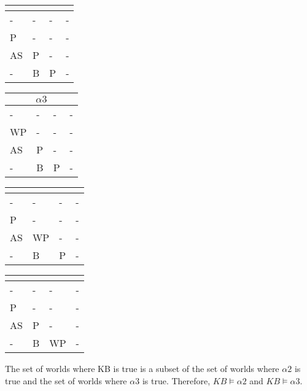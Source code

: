 \documentclass{math}
\begin{document}
\begin{center}
  \begin{tabular}{|p{0.6cm}|p{0.6cm}|p{0.6cm}|p{0.6cm}|}
    \hline
    \multicolumn{4}{|c|}{} \\ \hline
    - & - & - & - \\ \hline
    P & - & - & - \\ \hline
    AS & P & - & - \\ \hline
    - & B & P & - \\ \hline
  \end{tabular}
  \begin{tabular}{|p{0.6cm}|p{0.6cm}|p{0.6cm}|p{0.6cm}|}
    \hline
    \multicolumn{4}{|c|}{\( \alpha3 \)} \\ \hline
    - & - & - & - \\ \hline
    WP & - & - & - \\ \hline
    AS & P & - & - \\ \hline
    - & B & P & - \\ \hline
  \end{tabular}
  \begin{tabular}{|p{0.6cm}|p{0.6cm}|p{0.6cm}|p{0.6cm}|}
    \hline
    \multicolumn{4}{|c|}{} \\ \hline
    - & - & - & - \\ \hline
    P & - & - & - \\ \hline
    AS & WP & - & - \\ \hline
    - & B & P & - \\ \hline
  \end{tabular}
  \begin{tabular}{|p{0.6cm}|p{0.6cm}|p{0.6cm}|p{0.6cm}|}
    \hline
    \multicolumn{4}{|c|}{} \\ \hline
    - & - & - & - \\ \hline
    P & - & - & - \\ \hline
    AS & P & - & - \\ \hline
    - & B & WP & - \\ \hline
  \end{tabular}
\end{center}
The set of worlds where KB is true is a subset of the set of worlds where
\( \alpha2 \) is true and the set of worlds where \( \alpha3 \) is true.
Therefore, \( KB\models\alpha2 \) and \( KB\models\alpha3 \).
\end{document}
